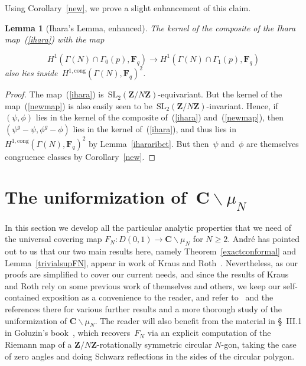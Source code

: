 \documentclass[10pt]{amsart}
\def\Hcong{H^{1,\mathrm{cong}}}
\def\SSSS{\S}
\renewcommand\setminus{\smallsetminus}
\def\F{\mathbf{F}}
\def\Z{\mathbf{Z}}
\newtheorem{lemma}[subsubsection]{Lemma}
\theoremstyle{remark}
\numberwithin{equation}{subsection}
\def\numequation{\addtocounter{subsubsection}{1}\begin{equation}}
\def\C{\mathbf{C}}
\def\SL{\mathrm{SL}}
\begin{document}
Using  Corollary~\ref{new}, we prove a slight enhancement of this
claim.

\begin{lemma}[Ihara's Lemma, enhanced] \label{enhanced}
The kernel of the composite of the Ihara map~(\ref{ihara})
with the map
\numequation
\label{newmap}
H^1(\Gamma(N) \cap \Gamma_0(p),\F_q) \rightarrow H^1(\Gamma(N) \cap \Gamma_1(p),\F_q)
\end{equation}
also lies inside~$\Hcong(\Gamma(N),\F_q)^2$. 
\end{lemma}

\begin{proof}
The map~(\ref{ihara}) is~$\SL_2(\Z/N\Z)$-equivariant. But the kernel
of the map~(\ref{newmap}) is also easily seen to be~$\SL_2(\Z/N\Z)$-invariant.
Hence, if~$(\psi,\phi)$ lies in the kernel of the composite of~(\ref{ihara})
and~(\ref{newmap}), then~$(\psi^g - \psi,\phi^g - \phi)$ lies in the kernel of~(\ref{ihara}),
and thus lies in~$\Hcong(\Gamma(N),\F_q)^2$ by Lemma~\ref{ihararibet}. But then~$\psi$ and~$\phi$ are themselves
congruence classes by Corollary~\ref{new}.
\end{proof}











\section{The uniformization of~\texorpdfstring{$\C \setminus \mu_N$}{CminusMu}}
\label{uniformizations}

In this section we develop all the particular analytic properties that  we need of the universal 
covering map $F_N : D(0,1) \to \C \setminus \mu_N$ for $N\geq 2$.  Andr\'e has pointed out to us that
our two main results here, namely Theorem~\ref{exactconformal} and Lemma~\ref{trivialsupFN}, 
appear in work of Kraus and Roth~\cite[Remark 5.1 and Theorems 1.2 and 1.10]{KrausRoth}. Nevertheless, as our proofs are simplified to cover our current needs, and since the results of Kraus and Roth rely on some previous work of themselves and others, 
we keep our self-contained exposition as a convenience to the reader, and  refer to~\cite{ASVV,KrausRothSugawa,KrausRoth} and the references there for various further results and a more thorough study of the uniformization of 
$\C \setminus \mu_N$. The reader will also benefit from the material in \SSSS~III.1 in Goluzin's book~\cite{Goluzin}, which recovers~$F_N$ via  an explicit computation of the Riemann map of a $\Z / N\Z$-rotationally symmetric circular $N$-gon, taking the case of zero angles and doing Schwarz reflections in the sides of the circular polygon. 
\end{document}
